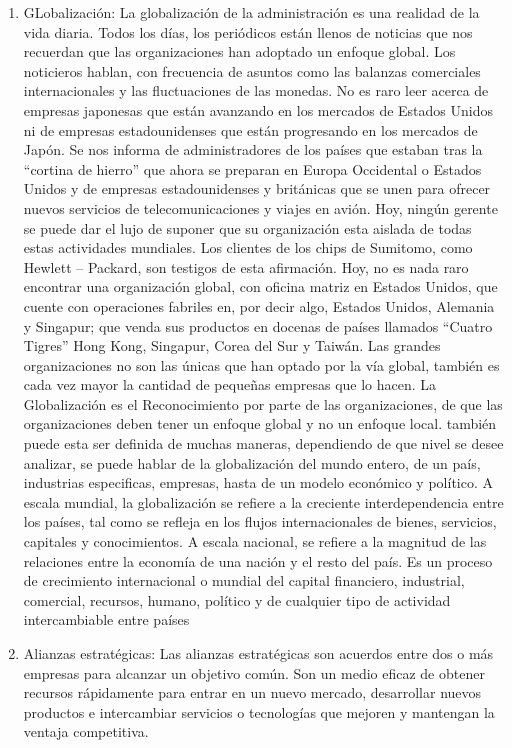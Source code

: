 \documentclass[letterpaper,12pt]{article}
\begin{document}
\begin{sloppypar}
\begin{enumerate}
    \item GLobalización: La globalización de la administración es una realidad de la vida diaria. Todos los días, los periódicos están
    llenos de noticias que nos recuerdan que las organizaciones han adoptado un enfoque global. Los noticieros
    hablan, con frecuencia de asuntos como las balanzas comerciales internacionales y las fluctuaciones de las
    monedas. No es raro leer acerca de empresas japonesas que están avanzando en los mercados de Estados
    Unidos ni de empresas estadounidenses que están progresando en los mercados de Japón. Se nos informa
    de administradores de los países que estaban tras la “cortina de hierro” que ahora se preparan en Europa
    Occidental o Estados Unidos y de empresas estadounidenses y británicas que se unen para ofrecer nuevos
    servicios de telecomunicaciones y viajes en avión. Hoy, ningún gerente se puede dar el lujo de suponer que
    su organización esta aislada de todas estas actividades mundiales. Los clientes de los chips de Sumitomo,
    como Hewlett – Packard, son testigos de esta afirmación.
    Hoy, no es nada raro encontrar una organización global, con oficina matriz en Estados Unidos, que cuente
    con operaciones fabriles en, por decir algo, Estados Unidos, Alemania y Singapur; que venda sus productos
    en docenas de países llamados “Cuatro Tigres” Hong Kong, Singapur, Corea del Sur y Taiwán.
    Las grandes organizaciones no son las únicas que han optado por la vía global, también es cada vez mayor
    la cantidad de pequeñas empresas que lo hacen. La Globalización es el Reconocimiento por parte de las
    organizaciones, de que las organizaciones deben tener un enfoque global y no un enfoque local. también
    puede esta ser definida de muchas maneras, dependiendo de que nivel se desee analizar, se puede hablar de
    la globalización del mundo entero, de un país, industrias especificas, empresas, hasta de un modelo
    económico y político.
    A escala mundial, la globalización se refiere a la creciente interdependencia entre los países, tal como se
    refleja en los flujos internacionales de bienes, servicios, capitales y conocimientos.
    A escala nacional, se refiere a la magnitud de las relaciones entre la economía de una nación y el resto del
    país.
    Es un proceso de crecimiento internacional o mundial del capital financiero, industrial, comercial, recursos,
    humano, político y de cualquier tipo de actividad intercambiable entre países

    \item Alianzas estratégicas: Las alianzas estratégicas son acuerdos entre dos o más empresas para alcanzar un objetivo común. Son un medio eficaz de obtener recursos rápidamente para entrar en un nuevo mercado, desarrollar nuevos productos e intercambiar servicios o tecnologías que mejoren y mantengan la ventaja competitiva. 


\end{enumerate}
\end{sloppypar}
\end{document}
